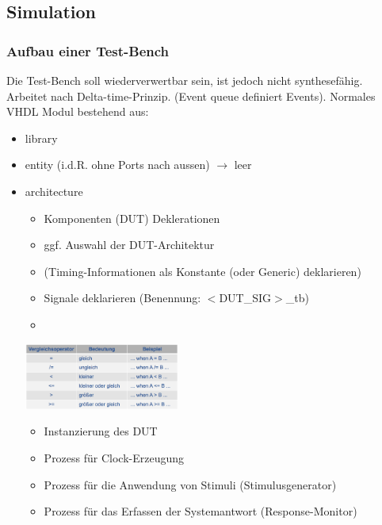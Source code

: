 \vspace{-3\baselineskip}
\begin{multicols}{2}
	\subsection{Simulation}
	\subsubsection{Aufbau einer Test-Bench}
	Die Test-Bench soll wiederverwertbar sein, ist jedoch nicht synthesefähig. Arbeitet nach Delta-time-Prinzip. (Event queue definiert Events). Normales VHDL Modul bestehend aus:
	\begin{itemize}
	\setlength\itemsep{-0.5em}
		\item library
		\item entity (i.d.R. ohne Ports nach aussen) $\rightarrow$ leer
		\item architecture
		\begin{itemize}
			\setlength\itemsep{-0.5em}
			\item Komponenten (DUT) Deklerationen
			\item ggf. Auswahl der DUT-Architektur
			\item (Timing-Informationen als Konstante (oder 
				Generic) deklarieren)
			\item Signale deklarieren (Benennung: $<$DUT\_SIG$>$\_tb)
			\item[\-] %
		\end{itemize}
		\begin{center}
			\includegraphics[width=0.4\textwidth]{images/arithvergleich}
		\end{center}
		\begin{itemize}
			\setlength\itemsep{-0.5em}
			\item Instanzierung des DUT
			\item Prozess für Clock-Erzeugung
			\item Prozess für die Anwendung von Stimuli 
				(Stimulusgenerator)
			\item Prozess für das Erfassen der Systemantwort 
				(Response-Monitor)
		\end{itemize}
	\end{itemize}
\end{multicols}

